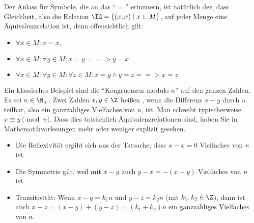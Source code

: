 %
Der Anlass für Symbole, die an das "`$=$"' erinnnern, ist natürlich
der, dass Gleichheit, also die Relation $\Id=\{ (x,x) \mid x\in M\}$,
auf jeder Menge eine Äquivalenzrelation ist, denn offensichtlich gilt:
\begin{itemize}
\item $\forall x\in M: x = x$,
\item $\forall x\in M: \forall y\in M: x = y ==> y = x$
\item $\forall x\in M: \forall y\in M: \forall z\in M: x= y \land
  y = z ==> x = z$
\end{itemize}
%
Ein klassisches Beispiel sind die "`Kongruenzen modulo $n$"' auf den
ganzen Zahlen. Es sei $n\in\N_+$. Zwei Zahlen $x,y\in \Z$ heißen
, wenn die Differenz $x-y$ durch $n$ teilbar, also
ein ganzzahliges Vielfaches von $n$, ist. Man schreibt typischerweise
$x\equiv y \pmod n$. Dass dies tatsächlich Äquivalenzrelationen sind,
haben Sie in Mathematikvorlesungen mehr oder weniger explizit gesehen.
\begin{itemize}
\item Die Reflexivität ergibt sich aus der Tatsache, dass $x-x=0$
  Vielfaches von $n$ ist.
\item Die Symmetrie gilt, weil mit $x-y$ auch $y-x=-(x-y)$ Vielfaches
  von $n$ ist.
\item Transitivität: Wenn $x-y=k_1n$ und $y-z=k_2n$ (mit $k_1,k_2\in
  \Z$), dann ist auch $x-z=(x-y)+(y-z)=(k_1+k_2)n$ ein ganzzahliges
  Vielfaches von $n$.
\end{itemize}


